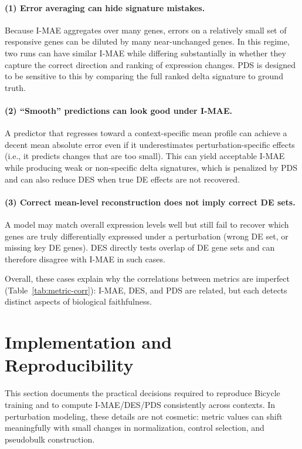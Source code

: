 \documentclass[12pt]{article}
\begin{document}
\paragraph{(1) Error averaging can hide signature mistakes.}
Because I-MAE aggregates over many genes, errors on a relatively small set of responsive genes can
be diluted by many near-unchanged genes. In this regime, two runs can have similar I-MAE while
differing substantially in whether they capture the correct direction and ranking of expression changes.
PDS is designed to be sensitive to this by comparing the full ranked delta signature to ground truth.

\paragraph{(2) ``Smooth'' predictions can look good under I-MAE.}
A predictor that regresses toward a context-specific mean profile can achieve a decent mean absolute error
even if it underestimates perturbation-specific effects (i.e., it predicts changes that are too small).
This can yield acceptable I-MAE while producing weak or non-specific delta signatures, which is
penalized by PDS and can also reduce DES when true DE effects are not recovered.

\paragraph{(3) Correct mean-level reconstruction does not imply correct DE sets.}
A model may match overall expression levels well but still fail to recover which genes are truly
differentially expressed under a perturbation (wrong DE set, or missing key DE genes). DES directly
tests overlap of DE gene sets and can therefore disagree with I-MAE in such cases.

Overall, these cases explain why the correlations between metrics are imperfect (Table~\ref{tab:metric-corr}):
I-MAE, DES, and PDS are related, but each detects distinct aspects of biological faithfulness.

\section{Implementation and Reproducibility}\label{implementation}
This section documents the practical decisions required to reproduce Bicycle training and to
compute I-MAE/DES/PDS consistently across contexts. In perturbation modeling, these details are
not cosmetic: metric values can shift meaningfully with small changes in normalization, control
selection, and pseudobulk construction.
\end{document}
